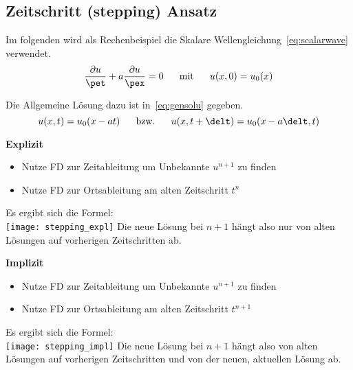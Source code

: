 \newpage

\subsection{Zeitschritt (stepping) Ansatz}
Im folgenden wird als Rechenbeispiel die Skalare Wellengleichung~\ref{eq:scalarwave} verwendet.
\begin{equation}
	\frac{\partial u}{\pet} + a\frac{\partial u}{\pex} = 0~~~~~\textrm{mit}~~~~~
	u(x,0) = u_0(x)
	\label{eq:scalarwave} 
\end{equation}

Die Allgemeine L\"osung dazu ist in~\ref{eq:gensolu} gegeben.
\begin{equation}
	u(x,t) = u_0(x - at)~~~~~\textrm{bzw.}~~~~~
	u(x,t + \delt) = u_0(x - a\delt,t)
	\label{eq:gensolu} 
\end{equation}

\begin{multicols}{2}
	\textbf{Explizit}
	\begin{itemize}
		\item Nutze FD zur Zeitableitung um Unbekannte $u^{n+1}$ zu finden
		\item Nutze FD zur Ortsableitung am alten Zeitschritt $t^n$
	\end{itemize}
	Es ergibt sich die Formel:\\
	\texttt{[image: stepping\_expl]}
	Die neue L\"osung bei $n+1$ h\"angt also nur von alten L\"osungen auf vorherigen Zeitschritten ab.

\columnbreak

	\textbf{Implizit}
	\begin{itemize}
		\item Nutze FD zur Zeitableitung um Unbekannte $u^{n+1}$ zu finden
		\item Nutze FD zur Ortsableitung am alten Zeitschritt $t^{n+1}$
	\end{itemize}
	Es ergibt sich die Formel:\\
	\texttt{[image: stepping\_impl]}
	Die neue L\"osung bei $n+1$ h\"angt also von alten L\"osungen auf vorherigen Zeitschritten und von der neuen, aktuellen L\"osung ab.
\end{multicols}

